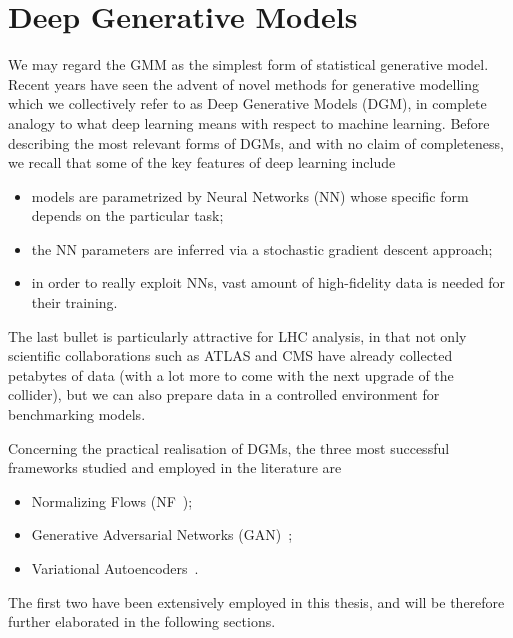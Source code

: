 \section{Deep Generative Models}\label{sec:DGM}
We may regard the GMM as the simplest form of statistical generative model. Recent years have seen the advent of novel methods for generative modelling which we collectively refer to as Deep Generative Models (DGM), in complete analogy to what deep learning means with respect to machine learning. 
Before describing the most relevant forms of DGMs, and with no claim of completeness, we recall that some of the key features of deep learning include
\begin{itemize}
\item
models are parametrized by Neural Networks (NN) whose specific form depends on the particular task;
\item
the NN parameters are inferred via a stochastic gradient descent approach;
\item
in order to really exploit NNs, vast amount of high-fidelity data is needed for their training.
\end{itemize}
The last bullet is particularly attractive for LHC analysis, in that not only scientific collaborations such as ATLAS and CMS have already collected petabytes of data (with a lot more to come with the next upgrade of the collider), but we can also prepare data in a controlled environment for benchmarking models.

Concerning the practical realisation of DGMs, the three most successful frameworks studied and employed in the literature are
\begin{itemize}
\item
Normalizing Flows (NF~\cite{inn,coupling2,glow, nflow1,papamakarios2019normalizing,nflow_review,mller2018neural, grathwohl2018ffjord,chen2019neural});
\item
Generative Adversarial Networks (GAN)~\cite{goodfellow,Creswell2018, wgan_gp, wgan_original, lim2017geometric, zhang2019selfattention};
\item
Variational Autoencoders~\cite{kingma2014autoencoding,Kingma2019}.
\end{itemize}
The first two have been extensively employed in this thesis, and will be therefore further elaborated in the following sections.

